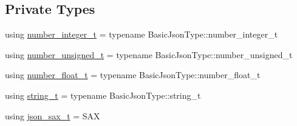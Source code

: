 \subsection*{Private Types}
\begin{DoxyCompactItemize}
\item 
using \mbox{\hyperlink{classnlohmann_1_1detail_1_1binary__reader_aa093d9bce6c6ec715a049f2a26d7c4d5}{number\+\_\+integer\+\_\+t}} = typename Basic\+Json\+Type\+::number\+\_\+integer\+\_\+t
\item 
using \mbox{\hyperlink{classnlohmann_1_1detail_1_1binary__reader_a13bb5e2014c4cdf013d8715157cb456e}{number\+\_\+unsigned\+\_\+t}} = typename Basic\+Json\+Type\+::number\+\_\+unsigned\+\_\+t
\item 
using \mbox{\hyperlink{classnlohmann_1_1detail_1_1binary__reader_af4488e5400da86636fd2f4d0171bbf53}{number\+\_\+float\+\_\+t}} = typename Basic\+Json\+Type\+::number\+\_\+float\+\_\+t
\item 
using \mbox{\hyperlink{classnlohmann_1_1detail_1_1binary__reader_aa0b9729917ca7ee6ed01e3792341316e}{string\+\_\+t}} = typename Basic\+Json\+Type\+::string\+\_\+t
\item 
using \mbox{\hyperlink{classnlohmann_1_1detail_1_1binary__reader_a43c5dc6a3219f64a7824d7ba9c7b14ae}{json\+\_\+sax\+\_\+t}} = S\+AX
\end{DoxyCompactItemize}
